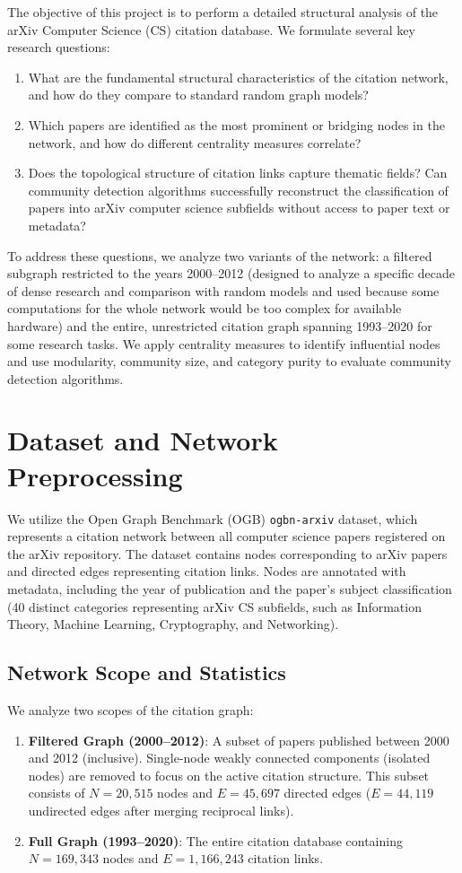 \documentclass[11pt,a4paper]{article}
\begin{document}
The objective of this project is to perform a detailed structural analysis of the arXiv Computer Science (CS) citation database. We formulate several key research questions:
\begin{enumerate}
    \item What are the fundamental structural characteristics of the citation network, and how do they compare to standard random graph models?
    \item Which papers are identified as the most prominent or bridging nodes in the network, and how do different centrality measures correlate?
    \item Does the topological structure of citation links capture thematic fields? Can community detection algorithms successfully reconstruct the classification of papers into arXiv computer science subfields without access to paper text or metadata?
\end{enumerate}

To address these questions, we analyze two variants of the network: a filtered subgraph
restricted to the years 2000--2012 (designed to analyze a specific decade of dense research
and comparison with random models and used because some computations for the whole network would be too complex
for available hardware) and the entire, unrestricted citation graph spanning
1993--2020 for some research tasks. We apply centrality measures to identify influential nodes and use modularity, community size, and category purity to evaluate community detection algorithms.

\section{Dataset and Network Preprocessing}
We utilize the Open Graph Benchmark (OGB) \texttt{ogbn-arxiv} dataset, which represents a citation network between all computer science papers registered on the arXiv repository. The dataset contains nodes corresponding to arXiv papers and directed edges representing citation links. Nodes are annotated with metadata, including the year of publication and the paper's subject classification (40 distinct categories representing arXiv CS subfields, such as Information Theory, Machine Learning, Cryptography, and Networking).

\subsection{Network Scope and Statistics}
We analyze two scopes of the citation graph:
\begin{enumerate}
    \item \textbf{Filtered Graph (2000--2012)}: A subset of papers published between 2000 and 2012 (inclusive). Single-node weakly connected components (isolated nodes) are removed to focus on the active citation structure. This subset consists of $N = 20,515$ nodes and $E = 45,697$ directed edges ($E = 44,119$ undirected edges after merging reciprocal links).
    \item \textbf{Full Graph (1993--2020)}: The entire citation database containing $N = 169,343$ nodes and $E = 1,166,243$ citation links.
\end{enumerate}
\end{document}
